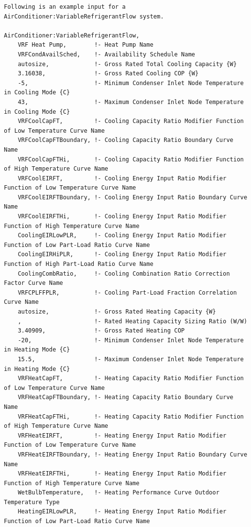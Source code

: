 \begin{lstlisting}
Following is an example input for a AirConditioner:VariableRefrigerantFlow system.

AirConditioner:VariableRefrigerantFlow,
    VRF Heat Pump,        !- Heat Pump Name
    VRFCondAvailSched,    !- Availability Schedule Name
    autosize,             !- Gross Rated Total Cooling Capacity {W}
    3.16038,              !- Gross Rated Cooling COP {W}
    -5,                   !- Minimum Condenser Inlet Node Temperature in Cooling Mode {C}
    43,                   !- Maximum Condenser Inlet Node Temperature in Cooling Mode {C}
    VRFCoolCapFT,         !- Cooling Capacity Ratio Modifier Function of Low Temperature Curve Name
    VRFCoolCapFTBoundary, !- Cooling Capacity Ratio Boundary Curve Name
    VRFCoolCapFTHi,       !- Cooling Capacity Ratio Modifier Function of High Temperature Curve Name
    VRFCoolEIRFT,         !- Cooling Energy Input Ratio Modifier Function of Low Temperature Curve Name
    VRFCoolEIRFTBoundary, !- Cooling Energy Input Ratio Boundary Curve Name
    VRFCoolEIRFTHi,       !- Cooling Energy Input Ratio Modifier Function of High Temperature Curve Name
    CoolingEIRLowPLR,     !- Cooling Energy Input Ratio Modifier Function of Low Part-Load Ratio Curve Name
    CoolingEIRHiPLR,      !- Cooling Energy Input Ratio Modifier Function of High Part-Load Ratio Curve Name
    CoolingCombRatio,     !- Cooling Combination Ratio Correction Factor Curve Name
    VRFCPLFFPLR,          !- Cooling Part-Load Fraction Correlation Curve Name
    autosize,             !- Gross Rated Heating Capacity {W}
    ,                     !- Rated Heating Capacity Sizing Ratio (W/W)
    3.40909,              !- Gross Rated Heating COP
    -20,                  !- Minimum Condenser Inlet Node Temperature in Heating Mode {C}
    15.5,                 !- Maximum Condenser Inlet Node Temperature in Heating Mode {C}
    VRFHeatCapFT,         !- Heating Capacity Ratio Modifier Function of Low Temperature Curve Name
    VRFHeatCapFTBoundary, !- Heating Capacity Ratio Boundary Curve Name
    VRFHeatCapFTHi,       !- Heating Capacity Ratio Modifier Function of High Temperature Curve Name
    VRFHeatEIRFT,         !- Heating Energy Input Ratio Modifier Function of Low Temperature Curve Name
    VRFHeatEIRFTBoundary, !- Heating Energy Input Ratio Boundary Curve Name
    VRFHeatEIRFTHi,       !- Heating Energy Input Ratio Modifier Function of High Temperature Curve Name
    WetBulbTemperature,   !- Heating Performance Curve Outdoor Temperature Type
    HeatingEIRLowPLR,     !- Heating Energy Input Ratio Modifier Function of Low Part-Load Ratio Curve Name

\end{lstlisting}
